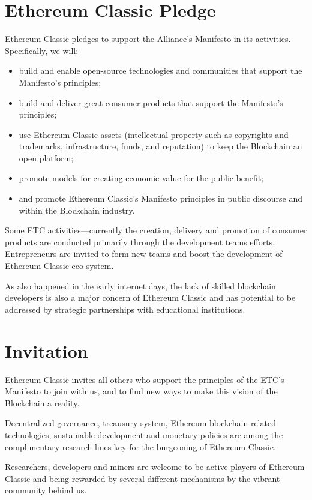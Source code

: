 \documentclass[twoside,twocolumn]{article}
\begin{document}
\section{Ethereum Classic Pledge}
Ethereum Classic pledges to support the Alliance's Manifesto in
its activities. Specifically, we will:

\begin{itemize}
  \item build and enable open-source technologies and communities that support
  the Manifesto’s principles;
  \item build and deliver great consumer products that support the Manifesto’s
  principles;
  \item use Ethereum Classic assets (intellectual property such as copyrights and
  trademarks, infrastructure, funds, and reputation) to keep the Blockchain an
  open platform;
  \item promote models for creating economic value for the public benefit;
  \item and promote Ethereum Classic's Manifesto principles in public discourse and
  within the Blockchain industry.
\end{itemize}

Some ETC activities—currently the creation, delivery and promotion of
consumer products are conducted primarily through the development teams efforts.
Entrepreneurs are invited to form new teams and boost the development of
Ethereum Classic eco-system.

As also happened in the early internet days, the lack of skilled
blockchain developers is also a major concern of Ethereum Classic and has
potential to be addressed by strategic partnerships with educational institutions.

\section{Invitation}

Ethereum Classic invites all others who support the principles of the
ETC's Manifesto to join with us, and to find new ways to make this vision
of the Blockchain a reality.

Decentralized governance, treausury system, Ethereum blockchain related
technologies, sustainable development and monetary policies are among the
complimentary research lines key for the burgeoning of Ethereum Classic.

Researchers, developers and miners are welcome to be active players of Ethereum
Classic and being rewarded by several different mechanisms by the vibrant
community behind us.
\end{document}
